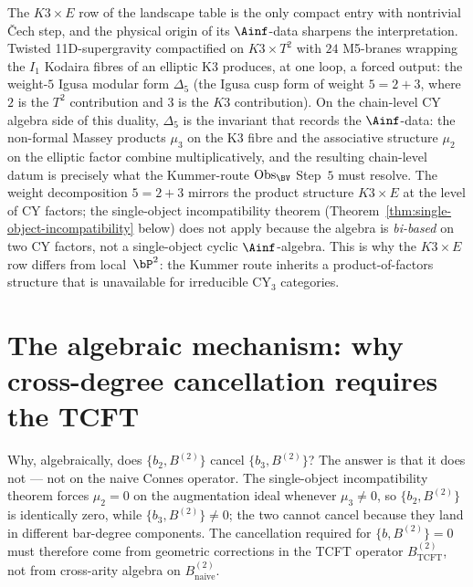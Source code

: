 \begin{remark}
\label{rem:m3b2-DNA-sugra-forcing}
The $K3 \times E$ row of the landscape table is the only compact
entry with nontrivial \v{C}ech step, and the physical origin of
its $\Ainf$-data sharpens the interpretation.  Twisted
11D-supergravity compactified on $K3 \times T^2$ with $24$ M5-branes
wrapping the $I_1$ Kodaira fibres of an elliptic K3 produces, at
one loop, a forced output: the weight-$5$ Igusa modular form
$\Delta_5$ (the Igusa cusp form of weight $5 = 2 + 3$, where
$2$ is the $T^2$ contribution and $3$ is the $K3$
contribution).  On the chain-level CY algebra side of this
duality, $\Delta_5$ is the invariant that records the
$\Ainf$-data: the non-formal Massey products $\mu_3$ on the K3
fibre and the associative structure $\mu_2$ on the elliptic
factor combine multiplicatively, and the resulting chain-level
datum is precisely what the Kummer-route
$\mathrm{Obs}_{\BV}$ Step~$5$ must resolve.  The weight
decomposition $5 = 2 + 3$ mirrors the product structure
$K3 \times E$ at the level of CY factors; the single-object
incompatibility theorem (Theorem~\ref{thm:single-object-incompatibility}
below) does not apply because the algebra is
\emph{bi-based} on two CY factors, not a single-object cyclic
$\Ainf$-algebra.  This is why the $K3 \times E$ row differs from
local~$\bP^2$: the Kummer route inherits a product-of-factors
structure that is unavailable for irreducible CY$_3$ categories.
\end{remark}


\section{The algebraic mechanism: why cross-degree cancellation
requires the TCFT}
\label{sec:m3b2-algebraic-mechanism}

Why, algebraically, does $\{b_2, B^{(2)}\}$ cancel
$\{b_3, B^{(2)}\}$?  The answer is that it does not --- not on
the naive Connes operator.  The single-object incompatibility
theorem forces $\mu_2 = 0$ on the augmentation ideal whenever
$\mu_3 \neq 0$, so $\{b_2, B^{(2)}\}$ is identically zero, while
$\{b_3, B^{(2)}\} \neq 0$; the two cannot cancel because they
land in different bar-degree components.  The cancellation
required for $\{b, B^{(2)}\} = 0$ must therefore come from
geometric corrections in the TCFT operator $B^{(2)}_{\mathrm{TCFT}}$,
not from cross-arity algebra on $B^{(2)}_{\mathrm{naive}}$.

